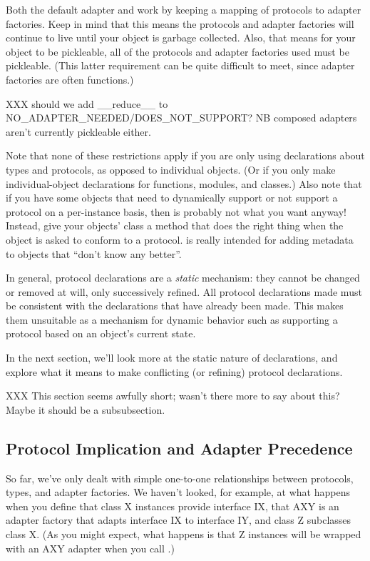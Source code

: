 \begin{verbatim%
}
\begin{verbatim%
}
\begin{verbatim%
}
\begin{verbatim%
}
Both the default adapter and  work by keeping a mapping of
protocols to adapter factories.  Keep in mind that this means the protocols and
adapter factories will continue to live until your object is garbage collected.
Also, that means for your object to be pickleable, all of the protocols and
adapter factories used must be pickleable.  (This latter requirement can be
quite difficult to meet, since adapter factories are often functions.)

XXX should we add __reduce__ to NO_ADAPTER_NEEDED/DOES_NOT_SUPPORT?  NB
composed adapters aren't currently pickleable either.

Note that none of these restrictions apply if you are only using declarations
about types and protocols, as opposed to individual objects.  (Or if you only
make individual-object declarations for functions, modules, and classes.)
Also note that if you have some objects that need to dynamically support or
not support a protocol on a per-instance basis, then 
is probably not what you want anyway!  Instead, give your objects' class a
 method that does the right thing when the object is
asked to conform to a protocol.   is really intended
for adding metadata to objects that ``don't know any better''.

In general, protocol declarations are a \emph{static} mechanism: they cannot be
changed or removed at will, only successively refined.  All protocol
declarations made must be consistent with the declarations that have already
been made.  This makes them unsuitable as a mechanism for dynamic behavior such
as supporting a protocol based on an object's current state.

In the next section, we'll look more at the static nature of declarations,
and explore what it means to make conflicting (or refining) protocol
declarations.

XXX This section seems awfully short; wasn't there more to say about this?
Maybe it should be a subsubsection.









\subsection{Protocol Implication and Adapter Precedence \label{proto-implication}}

So far, we've only dealt with simple one-to-one relationships between
protocols, types, and adapter factories.  We haven't looked, for example, at
what happens when you define that class X instances provide interface IX,
that AXY is an adapter factory that adapts interface IX to interface IY, and
class Z subclasses class X.  (As you might expect, what happens is that Z
instances will be wrapped with an AXY adapter when you call
.)


\end{verbatim%
}
\end{verbatim%
}
\end{verbatim%
}
\end{verbatim%
}
